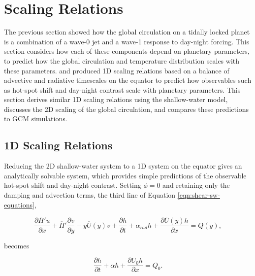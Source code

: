 



\section{Scaling Relations}\label{sec:sw-scaling-relations}

The previous section showed how the global circulation on a tidally locked planet is a combination of a wave-0 jet and a wave-1 response to day-night forcing. This section considers how each of these components depend on planetary parameters, to predict how the global circulation and temperature distribution scales with these parameters. \citet{komacek2016daynightI} and \citet{zhang2017dynamics} produced 1D scaling relations based on a balance of advective and radiative timescales on the equator to predict how observables such as hot-spot shift and day-night contrast scale with planetary parameters. This section derives similar 1D scaling relations using the shallow-water model, discusses the 2D scaling of the global circulation, and compares these predictions to GCM simulations.

\subsection{1D Scaling Relations}\label{sec:1d-scaling}

Reducing the 2D shallow-water system to a 1D system on the equator gives an analytically solvable system, which provides simple predictions of the observable hot-spot shift and day-night contrast. Setting $\phi = 0$ and retaining only the damping and advection terms, the third line of Equation \ref{eqn:shear-sw-equations},

\begin{equation}
      \frac{\partial \overline{H}' u}{\partial x} + \overline{H}'\frac{\partial v}{\partial y} - y\overline{U}(y) v +\frac{\partial h}{\partial t} +  \alpha_{rad} h + \frac{\partial \overline{U}(y) h}{\partial x} = Q(y),
\end{equation}

becomes

\begin{equation}
   \frac { \partial  h  } { \partial t } + \alpha h + \frac { \partial  U_{0} h } { \partial x } = Q_{0}.
\end{equation}

